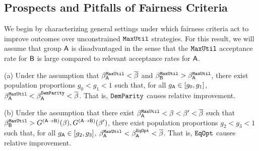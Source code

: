 \subsection{Prospects and Pitfalls of Fairness Criteria}
\label{sec:active_harm_fairness}
We begin by characterizing general settings under which fairness criteria act to improve outcomes over unconstrained $\mathtt{MaxUtil}$ strategies. For this result, we will assume that group $\mathsf{A}$ is disadvantaged in the sense that the $\mathtt{MaxUtil}$ acceptance rate for $\mathsf{B}$ is large compared to relevant acceptance rates for $\mathsf{A}$.


\begin{cor}\label{cor:fairness_rel_imp}
	
	(a) Under the assumption that $\beta_{\mathsf{A}}^{\mathtt{MaxUtil}}<\overline{\beta}$ and $\beta_{\mathsf{B}}^{\mathtt{MaxUtil}} > \beta^{\mathtt{MaxUtil}}_{\mathsf{A}}$,  there exist population proportions $g_0<g_1<1$ such that, for all $g_{\mathsf{A}} \in [g_0,g_1]$, $\beta_{\mathsf{A}}^{\mathtt{MaxUtil}}<\beta_{\mathsf{A}}^{\mathtt{DemParity}} < \overline{\beta}$. That is, $\mathtt{DemParity}$ causes relative improvement. 
	
	(b) Under the assumption that there exist $\beta_{\mathsf{A}}^{\mathtt{MaxUtil}}<\beta<\beta'<\overline{\beta}$ such that $\beta_{\mathsf{B}}^{\mathtt{MaxUtil}} > G^{(\mathsf{A}\to\mathsf{B})}(\beta), G^{(\mathsf{A}\to\mathsf{B})}(\beta')$,
	there exist population proportions $g_2<g_3<1$ such that, for all $g_{\mathsf{A}} \in [g_2,g_3]$, $\beta_{\mathsf{A}}^{\mathtt{MaxUtil}}<\beta_{\mathsf{A}}^{\mathtt{EqOpt}} <\overline{\beta}$. That is, $\mathtt{EqOpt}$ causes relative improvement.
\end{cor}







